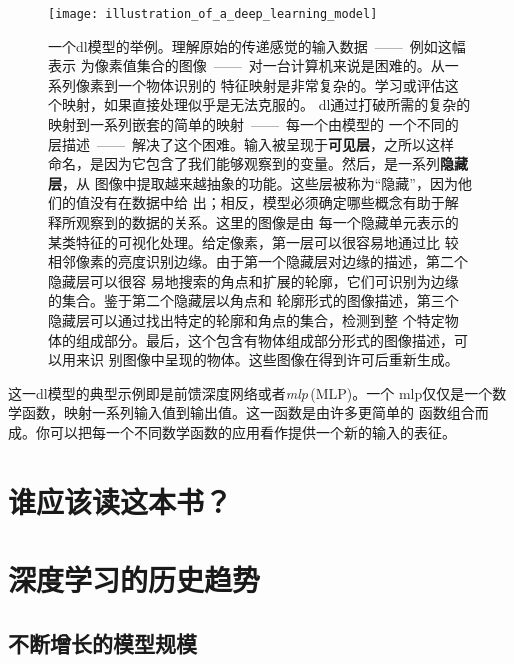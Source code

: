 \begin{figure}[h]
  \centering
  \texttt{[image: illustration\_of\_a\_deep\_learning\_model]}
  \caption{一个\gls*{dl}模型的举例。理解原始的传递感觉的输入数据~——~例如这幅表示
    为像素值集合的图像~——~对一台计算机来说是困难的。从一系列像素到一个物体识别的
    特征映射是非常复杂的。学习或评估这个映射，如果直接处理似乎是无法克服的。
    \gls*{dl}通过打破所需的复杂的映射到一系列嵌套的简单的映射~——~每一个由模型的
    一个不同的层描述~——~解决了这个困难。输入被呈现于\textbf{可见层}，之所以这样
    命名，是因为它包含了我们能够观察到的变量。然后，是一系列\textbf{隐藏层}，从
    图像中提取越来越抽象的功能。这些层被称为``隐藏''，因为他们的值没有在数据中给
    出；相反，模型必须确定哪些概念有助于解释所观察到的数据的关系。这里的图像是由
    每一个隐藏单元表示的某类特征的可视化处理。给定像素，第一层可以很容易地通过比
    较相邻像素的亮度识别边缘。由于第一个隐藏层对边缘的描述，第二个隐藏层可以很容
    易地搜索的角点和扩展的轮廓，它们可识别为边缘的集合。鉴于第二个隐藏层以角点和
    轮廓形式的图像描述，第三个隐藏层可以通过找出特定的轮廓和角点的集合，检测到整
    个特定物体的组成部分。最后，这个包含有物体组成部分形式的图像描述，可以用来识
    别图像中呈现的物体。这些图像在得到\citet{ZeilerFergus14}许可后重新生成。
   \label{fig:illustration_of_a_deep_learning_model}}
\end{figure}

这一\gls*{dl}模型的典型示例即是前馈深度网络或者\emph{\gls{mlp}}\,(MLP)。一个
\gls*{mlp}仅仅是一个数学函数，映射一系列输入值到输出值。这一函数是由许多更简单的
函数组合而成。你可以把每一个不同数学函数的应用看作提供一个新的输入的表征。

\section{谁应该读这本书？}

\section{深度学习的历史趋势}



\subsection{不断增长的模型规模}
\label{subsec:increasing_model_sizes}
